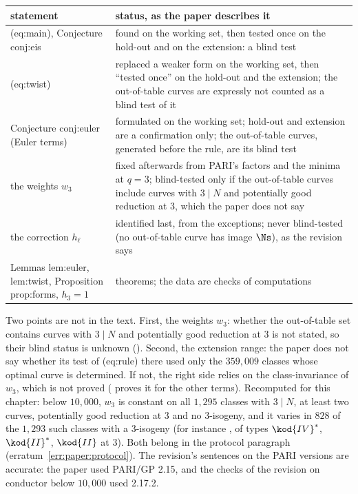 \begin{sloppypar}
\begin{center}\small
\begin{tabular}{p{}p{}}
\toprule
statement & status, as the paper describes it\\
\midrule
(eq:main), Conjecture conj:eis & found on the working set, then tested once on the hold-out and on the extension: a blind test\\
(eq:twist) & replaced a weaker form on the working set, then ``tested once'' on the hold-out and the extension; the out-of-table curves are expressly not counted as a blind test of it\\
Conjecture conj:euler (Euler terms) & formulated on the working set; hold-out and extension are a confirmation only; the out-of-table curves, generated before the rule, are its blind test\\
the weights $w_3$ & fixed afterwards from PARI's factors and the minima at $q=3$; blind-tested only if the out-of-table curves include curves with $3\mid N$ and potentially good reduction at $3$, which the paper does not say\\
the correction $h_\ell$ & identified last, from the exceptions; never blind-tested (no out-of-table curve has image $\Ns$), as the revision says\\
Lemmas lem:euler, lem:twist, Proposition prop:forms, $h_3=1$ & theorems; the data are checks of computations\\
\bottomrule
\end{tabular}
\end{center}

Two points are not in the text. First, the weights $w_3$: whether the out-of-table set contains curves with $3\mid N$ and potentially good reduction at $3$ is not stated, so their
blind status is unknown (). Second, the extension range: the paper does not say whether its test of (eq:rule) there used only the $359{,}009$ classes whose
optimal curve is determined. If not, the right side relies on the class-invariance of $w_3$, which is not proved ( proves it for the other terms). Recomputed for
this chapter: below $10{,}000$, $w_3$ is constant on all $1{,}295$ classes with $3\mid N$, at least two curves, potentially good reduction at $3$ and no $3$-isogeny, and it varies in $828$
of the $1{,}293$ such classes with a $3$-isogeny (for instance , of types $\kod{IV}^*$, $\kod{II}^*$, $\kod{II}$ at $3$). Both belong in the protocol paragraph (erratum~\ref{err:paper:protocol}). The
revision's sentences on the PARI versions are accurate: the paper used PARI/GP 2.15, and the checks of the revision on conductor below $10{,}000$ used 2.17.2.


\end{sloppypar}

